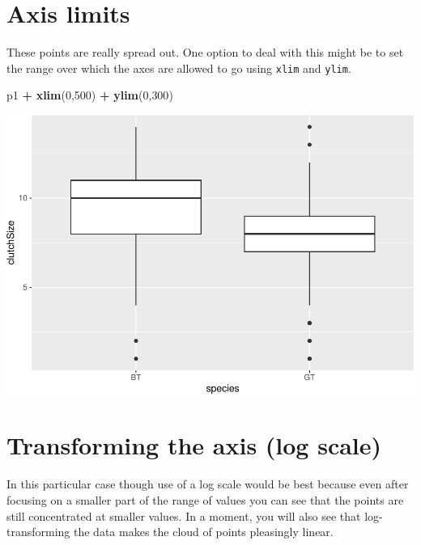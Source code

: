 \documentclass[
  a4paperpaper,
]{book}
\newenvironment{Shaded}{\begin{snugshade}}{\end{snugshade}}
\newcommand{\DecValTok}[1]{\textcolor[rgb]{0.00,0.00,0.81}{#1}}
\newcommand{\KeywordTok}[1]{\textcolor[rgb]{0.13,0.29,0.53}{\textbf{#1}}}
\newcommand{\NormalTok}[1]{#1}
\newcommand{\OperatorTok}[1]{\textcolor[rgb]{0.81,0.36,0.00}{\textbf{#1}}}
\newcommand{\StringTok}[1]{\textcolor[rgb]{0.31,0.60,0.02}{#1}}
\begin{document}
\hypertarget{axis-limits}{%
\section{Axis limits}\label{axis-limits}}

These points are really spread out. One option to deal with this might be to set the range over which the axes are allowed to go using \texttt{xlim} and \texttt{ylim}.

\begin{Shaded}
\begin{Highlighting}[]
\NormalTok{p1 }\OperatorTok{+}\StringTok{ }
\StringTok{  }\KeywordTok{xlim}\NormalTok{(}\DecValTok{0}\NormalTok{,}\DecValTok{500}\NormalTok{) }\OperatorTok{+}\StringTok{ }
\StringTok{  }\KeywordTok{ylim}\NormalTok{(}\DecValTok{0}\NormalTok{,}\DecValTok{300}\NormalTok{)}
\end{Highlighting}
\end{Shaded}

\begin{center}\includegraphics{BB852_files/figure-latex/unnamed-chunk-111-1} \end{center}

\hypertarget{transforming-the-axis-log-scale}{%
\section{Transforming the axis (log scale)}\label{transforming-the-axis-log-scale}}

In this particular case though use of a log scale would be best because even after focusing on a smaller part of the range of values you can see that the points are still concentrated at smaller values. In a moment, you will also see that log-transforming the data makes the cloud of points pleasingly linear.
\end{document}

